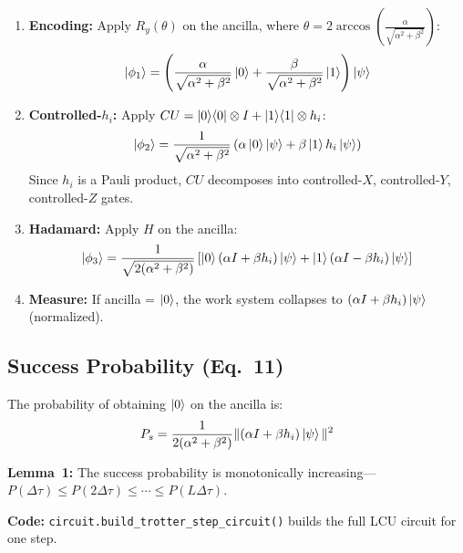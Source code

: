 \documentclass[11pt,a4paper]{article}
\begin{document}
\begin{enumerate}[nosep]
  \item \textbf{Encoding:} Apply $R_y(\theta)$ on the ancilla, where $\theta = 2\arccos\!\left(\frac{\alpha}{\sqrt{\alpha^2+\beta^2}}\right)$:
  \begin{equation}
    \ket{\phi_1} = \left(\frac{\alpha}{\sqrt{\alpha^2+\beta^2}}\ket{0} + \frac{\beta}{\sqrt{\alpha^2+\beta^2}}\ket{1}\right)\ket{\psi}
  \end{equation}

  \item \textbf{Controlled-$h_i$:} Apply $CU = \ket{0}\!\bra{0}\otimes I + \ket{1}\!\bra{1}\otimes h_i$:
  \begin{equation}
    \ket{\phi_2} = \frac{1}{\sqrt{\alpha^2+\beta^2}}\left(\alpha\ket{0}\ket{\psi} + \beta\ket{1}h_i\ket{\psi}\right)
  \end{equation}
  Since $h_i$ is a Pauli product, $CU$ decomposes into controlled-$X$, controlled-$Y$, controlled-$Z$ gates.

  \item \textbf{Hadamard:} Apply $H$ on the ancilla:
  \begin{equation}
    \ket{\phi_3} = \frac{1}{\sqrt{2(\alpha^2+\beta^2)}}\left[\ket{0}(\alpha I + \beta h_i)\ket{\psi} + \ket{1}(\alpha I - \beta h_i)\ket{\psi}\right]
  \end{equation}

  \item \textbf{Measure:} If ancilla = $\ket{0}$, the work system collapses to $(\alpha I + \beta h_i)\ket{\psi}$ (normalized).
\end{enumerate}

\subsection{Success Probability (Eq.~11)}

The probability of obtaining $\ket{0}$ on the ancilla is:
\begin{equation}
  P_s = \frac{1}{2(\alpha^2+\beta^2)}\|(\alpha I + \beta h_i)\ket{\psi}\|^2
  \label{eq:success_prob}
\end{equation}

\textbf{Lemma~1:} The success probability is monotonically increasing---$P(\Delta\tau) \leq P(2\Delta\tau) \leq \cdots \leq P(L\Delta\tau)$.

\vspace{0.3em}
\noindent\textbf{Code:} \texttt{circuit.build\_trotter\_step\_circuit()} builds the full LCU circuit for one step.
\end{document}

